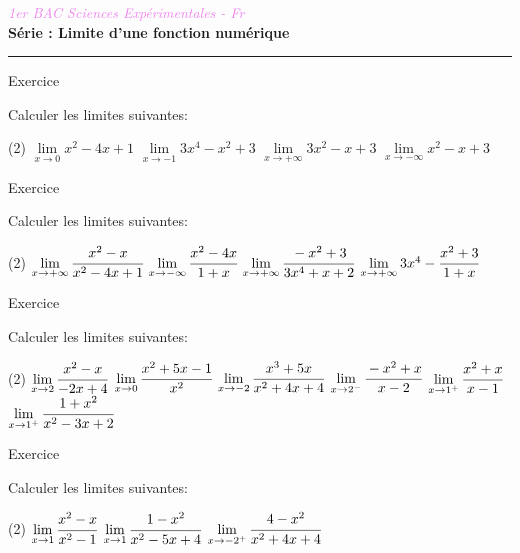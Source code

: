 \documentclass[a4paper,10pt]{article}
\newcounter{numexo}
\newcommand{\numexo}{Exercice \thenumexo \addtocounter{numexo}{1} }
\begin{document}
\begin{center}
{\Large\textit{\textcolor{violet}{1er BAC Sciences Expérimentales - Fr}}} \vspace*{0.5cm} \\
{\Large \bf Série : Limite d'une fonction numérique } \\
\end{center}
\vspace*{-0.7cm}
\begin{center}
\rule{0.75\linewidth}{1pt}
\end{center}
\begin{multicols}{2}
\begin{mynewbox}{\numexo}
Calculer les limites suivantes:
\begin{tasks}(2)
\task $\lim\limits_{x \rightarrow 0} x^{2}-4 x+1$
\task $\lim\limits_{x \rightarrow-1} 3 x^{4}-x^{2}+3$
\task $\lim\limits_{x \rightarrow+\infty} 3 x^{2}-x+3$
\task $\lim\limits_{x \rightarrow-\infty} x^{2}-x+3$
\end{tasks}
\end{mynewbox}
\begin{mynewbox}{\numexo}
Calculer les limites suivantes:
\begin{tasks}(2)
\task $\lim\limits_{x \rightarrow+\infty} \cfrac{x^{2}-x}{x^{2}-4 x+1}$
\task $\lim\limits_{x \rightarrow-\infty} \cfrac{x^{2}-4 x}{1+x}$
\task $\lim\limits_{x \rightarrow+\infty} \cfrac{-x^{2}+3}{3 x^{4}+x+2}$
\task $\lim\limits_{x \rightarrow+\infty} 3 x^{4}-\cfrac{x^{2}+3}{1+x}$
\end{tasks}
\end{mynewbox}
\begin{mynewbox}{\numexo}
Calculer les limites suivantes:
\begin{tasks}(2)
\task $\lim\limits_{x \rightarrow 2} \cfrac{x^{2}-x}{-2 x+4}$
\task $\lim\limits_{x \rightarrow 0} \cfrac{x^{2}+5 x-1}{x^{2}}$
\task $\lim\limits_{x \rightarrow-2} \cfrac{x^{3}+5 x}{x^{2}+4 x+4}$
\task $\lim\limits_{x \rightarrow 2^{-}} \cfrac{-x^{2}+x}{x-2}$
\task $\lim\limits_{x \rightarrow 1^{+}} \cfrac{x^{2}+x}{x-1}$
\task $\lim\limits_{x \rightarrow 1^{+}} \cfrac{1+x^{2}}{x^{2}-3 x+2}$
\end{tasks}
\end{mynewbox}
\begin{mynewbox}{\numexo}
Calculer les limites suivantes:
\begin{tasks}(2)
\task $\lim\limits_{x \rightarrow 1} \cfrac{x^{2}-x}{x^{2}-1}$
\task $\lim\limits_{x \rightarrow 1} \cfrac{1-x^{2}}{x^{2}-5 x+4}$
\task $\lim\limits_{x \rightarrow-2^{+}} \cfrac{4-x^{2}}{x^{2}+4 x+4}$

\end{tasks}
\end{mynewbox}
\end{multicols}
\end{document}
